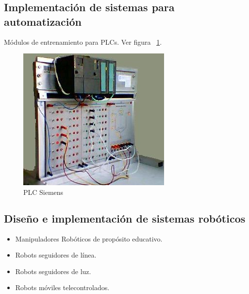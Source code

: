 \subsection{Implementación de sistemas para automatización}
Módulos de entrenamiento para PLCs. Ver figura ~\ref{fig:modulo-plc}. 
\begin{figure}[h!]
  \centering
  \includegraphics[scale=0.8]{images/company/modulo-plc.jpg}
  \caption{PLC Siemens}
  \label{fig:modulo-plc}
\end{figure}

\subsection{Diseño e implementación de sistemas robóticos}
\begin{itemize}
  \item Manipuladores Robóticos de propósito educativo.
  \item Robots seguidores de línea.
  \item Robots seguidores de luz.
  \item Robots móviles telecontrolados.
\end{itemize}

